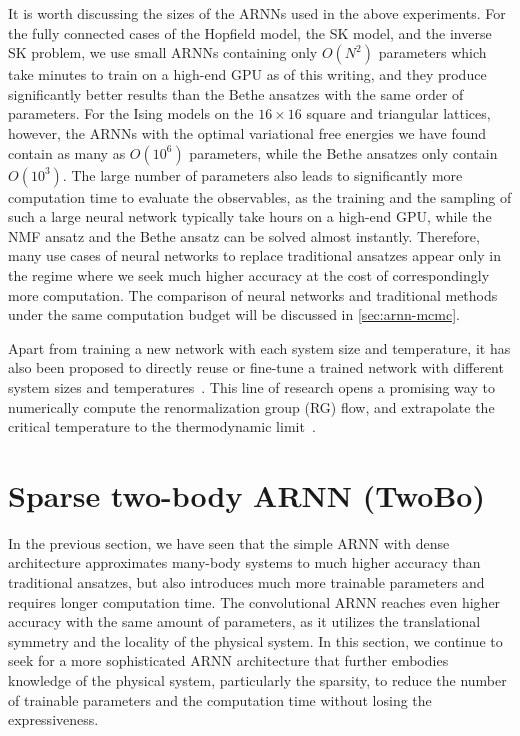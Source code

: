 It is worth discussing the sizes of the ARNNs used in the above experiments. For the fully connected cases of the Hopfield model, the SK model, and the inverse SK problem, we use small ARNNs containing only $O(N^2)$ parameters which take minutes to train on a high-end GPU as of this writing, and they produce significantly better results than the Bethe ansatzes with the same order of parameters. For the Ising models on the $16 \times 16$ square and triangular lattices, however, the ARNNs with the optimal variational free energies we have found contain as many as $O(10^6)$ parameters, while the Bethe ansatzes only contain $O(10^3)$. The large number of parameters also leads to significantly more computation time to evaluate the observables, as the training and the sampling of such a large neural network typically take hours on a high-end GPU, while the NMF ansatz and the Bethe ansatz can be solved almost instantly. Therefore, many use cases of neural networks to replace traditional ansatzes appear only in the regime where we seek much higher accuracy at the cost of correspondingly more computation. The comparison of neural networks and traditional methods under the same computation budget will be discussed in \cref{sec:arnn-mcmc}.

Apart from training a new network with each system size and temperature, it has also been proposed to directly reuse or fine-tune a trained network with different system sizes and temperatures~\cite{efthymiou2019super, mills2019extensive, rende2024fine}. This line of research opens a promising way to numerically compute the renormalization group (RG) flow, and extrapolate the critical temperature to the thermodynamic limit~\cite{ron2002inverse}.

\section{Sparse two-body ARNN (TwoBo)}

In the previous section, we have seen that the simple ARNN with dense architecture approximates many-body systems to much higher accuracy than traditional ansatzes, but also introduces much more trainable parameters and requires longer computation time. The convolutional ARNN reaches even higher accuracy with the same amount of parameters, as it utilizes the translational symmetry and the locality of the physical system. In this section, we continue to seek for a more sophisticated ARNN architecture that further embodies knowledge of the physical system, particularly the sparsity, to reduce the number of trainable parameters and the computation time without losing the expressiveness.

